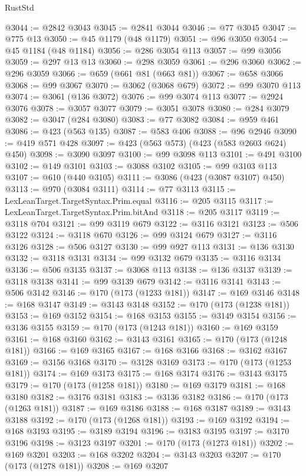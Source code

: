 \begin{lexlean}{RustStd}
\begin{coremodule}
@3044 := @2842 @3043
@3045 := @2841 @3044
@3046 := @77 @3045
@3047 := @775 @13
@3050 := @45 @1179 (@48 @1179)
@3051 := @96 @3050
@3054 := @45 @1184 (@48 @1184)
@3056 := @286 @3054 @113
@3057 := @99 @3056
@3059 := @297 @13 @13
@3060 := @298 @3059
@3061 := @296 @3060
@3062 := @296 @3059
@3066 := @659 (@661 @81 (@663 @81))
@3067 := @658 @3066
@3068 := @99 @3067
@3070 := @3062 (@3068 @679)
@3072 := @99 @3070 @113
@3074 := @3061 (@136 @3072)
@3076 := @99 @3074 @113
@3077 := @2924 @3076
@3078 := @3057 @3077
@3079 := @3051 @3078
@3080 := @284 @3079
@3082 := @3047 (@284 @3080)
@3083 := @77 @3082
@3084 := @959 @461
@3086 := @423 (@563 @135)
@3087 := @583 @406
@3088 := @96 @2946
@3090 := @419 @571 @428
@3097 := @423 (@563 @573) (@423 (@583 @2603 @624) @450)
@3098 := @3090 @3097
@3100 := @99 @3098 @113
@3101 := @491 @3100
@3102 := @149 @3101
@3103 := @3088 @3102
@3105 := @99 @3103 @113
@3107 := @610 (@440 @3105)
@3111 := @3086 (@423 (@3087 @3107) @450)
@3113 := @970 (@3084 @3111)
@3114 := @77 @3113
@3115 := LexLeanTarget.TargetSyntax.Prim.equal
@3116 := @205 @3115
@3117 := LexLeanTarget.TargetSyntax.Prim.bitAnd
@3118 := @205 @3117
@3119 := @3118 @704
@3121 := @99 @3119 @679
@3122 := @3116 @3121
@3123 := @506 @3122
@3124 := @3118 @670
@3126 := @99 @3124 @679
@3127 := @3116 @3126
@3128 := @506 @3127
@3130 := @99 @927 @113
@3131 := @136 @3130
@3132 := @3118 @3131
@3134 := @99 @3132 @679
@3135 := @3116 @3134
@3136 := @506 @3135
@3137 := @3068 @113
@3138 := @136 @3137
@3139 := @3118 @3138
@3141 := @99 @3139 @679
@3142 := @3116 @3141
@3143 := @506 @3142
@3146 := @170 (@173 (@1233 @181))
@3147 := @169 @3146
@3148 := @168 @3147
@3149 := @3143 @3148
@3152 := @170 (@173 (@1238 @181))
@3153 := @169 @3152
@3154 := @168 @3153
@3155 := @3149 @3154
@3156 := @3136 @3155
@3159 := @170 (@173 (@1243 @181))
@3160 := @169 @3159
@3161 := @168 @3160
@3162 := @3143 @3161
@3165 := @170 (@173 (@1248 @181))
@3166 := @169 @3165
@3167 := @168 @3166
@3168 := @3162 @3167
@3169 := @3156 @3168
@3170 := @3128 @3169
@3173 := @170 (@173 (@1253 @181))
@3174 := @169 @3173
@3175 := @168 @3174
@3176 := @3143 @3175
@3179 := @170 (@173 (@1258 @181))
@3180 := @169 @3179
@3181 := @168 @3180
@3182 := @3176 @3181
@3183 := @3136 @3182
@3186 := @170 (@173 (@1263 @181))
@3187 := @169 @3186
@3188 := @168 @3187
@3189 := @3143 @3188
@3192 := @170 (@173 (@1268 @181))
@3193 := @169 @3192
@3194 := @168 @3193
@3195 := @3189 @3194
@3196 := @3183 @3195
@3197 := @3170 @3196
@3198 := @3123 @3197
@3201 := @170 (@173 (@1273 @181))
@3202 := @169 @3201
@3203 := @168 @3202
@3204 := @3143 @3203
@3207 := @170 (@173 (@1278 @181))
@3208 := @169 @3207

\end{coremodule}
\end{lexlean}
